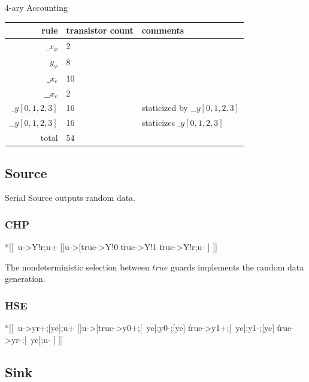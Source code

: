 \documentclass{article}
\begin{document}
4-ary Accounting

\begin{center}
    \begin{tabular}{|r|l|l|}
    \hline
    rule & transistor count & comments \\ \hline
    $\_x_\phi$ & 2 & \\ \hline
    $y_\phi$ & 8 & \\ \hline
    $\_x_e$ & 10 & \\ \hline
    $\_\_x_e$ & 2 & \\ \hline
    $\_y[0,1,2,3]$ & 16 & staticized by $\_\_y[0,1,2,3]$ \\ \hline
    $\_\_y[0,1,2,3]$ & 16 & staticizes $\_y[0,1,2,3]$ \\ \hline
    \hline total & 54 & \\ \hline
    \end{tabular}
\end{center}

\subsection{Source}

Serial Source outputs random data.

\subsubsection*{CHP}

\begin{csp}
*[[~u->Y!r;u+
  []u->[true->Y!0
         \|true->Y!1
         \|true->Y!\neg r;u-
         ]
 ]]
\end{csp}

\noindent
The nondeterministic selection between $true$ guards implements the random
data generation.

\subsubsection*{HSE}

\begin{hse}
*[[~u->yr+;[ye];u+
  []u->[true->y0+;[~ye];y0-;[ye]
         \|true->y1+;[~ye];y1-;[ye]
         \|true->yr-;[~ye];u-
         ]
 ]]
\end{hse}

\subsection{Sink}
\end{document}
